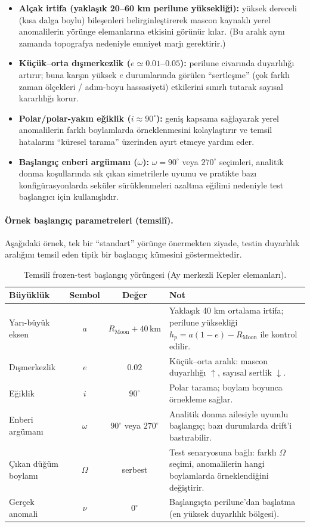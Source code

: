 \begin{itemize}
\item \textbf{Alçak irtifa (yaklaşık 20--60 km perilune yüksekliği):}
yüksek dereceli (kısa dalga boylu) bileşenleri belirginleştirerek mascon kaynaklı yerel anomalilerin
yörünge elemanlarına etkisini görünür kılar. (Bu aralık aynı zamanda topografya nedeniyle emniyet marjı gerektirir.)
\item \textbf{Küçük--orta dışmerkezlik ($e\simeq 0.01$--$0.05$):}
perilune civarında duyarlılığı artırır; buna karşın yüksek $e$ durumlarında görülen ``sertleşme''
(çok farklı zaman ölçekleri / adım-boyu hassasiyeti) etkilerini sınırlı tutarak sayısal kararlılığı korur.
\item \textbf{Polar/polar-yakın eğiklik ($i\approx 90^\circ$):}
geniş kapsama sağlayarak yerel anomalilerin farklı boylamlarda örneklenmesini kolaylaştırır ve
temsil hatalarını ``küresel tarama'' üzerinden ayırt etmeye yardım eder.
\item \textbf{Başlangıç enberi argümanı ($\omega$):}
$\omega=90^\circ$ veya $270^\circ$ seçimleri, analitik donma koşullarında sık çıkan simetrilerle uyumu ve
pratikte bazı konfigürasyonlarda seküler sürüklenmeleri azaltma eğilimi nedeniyle test başlangıcı için kullanışlıdır.
\end{itemize}

\paragraph{Örnek başlangıç parametreleri (temsilî).}
Aşağıdaki örnek, tek bir ``standart'' yörünge önermekten ziyade, testin duyarlılık aralığını
temsil eden tipik bir başlangıç kümesini göstermektedir.

\begin{table}[htbp]
\centering
\caption{Temsilî frozen-test başlangıç yörüngesi (Ay merkezli Kepler elemanları).}
\label{tab:frozen_test_ic}
\small
\begin{tabular}{l c c p{7.2cm}}
\toprule
\textbf{Büyüklük} & \textbf{Sembol} & \textbf{Değer} & \textbf{Not} \\
\midrule
Yarı-büyük eksen & $a$ &
$R_{\text{Moon}} + 40\,\text{km}$ &
Yaklaşık 40 km ortalama irtifa; perilune yüksekliği $h_p=a(1-e)-R_{\text{Moon}}$ ile kontrol edilir. \\
Dışmerkezlik & $e$ & $0.02$ &
Küçük--orta aralık: mascon duyarlılığı $\uparrow$, sayısal sertlik $\downarrow$. \\
Eğiklik & $i$ & $90^\circ$ &
Polar tarama; boylam boyunca örnekleme sağlar. \\
Enberi argümanı & $\omega$ & $90^\circ$ veya $270^\circ$ &
Analitik donma ailesiyle uyumlu başlangıç; bazı durumlarda drift’i bastırabilir. \\
Çıkan düğüm boylamı & $\Omega$ & serbest &
Test senaryosuna bağlı: farklı $\Omega$ seçimi, anomalilerin hangi boylamlarda örneklendiğini değiştirir. \\
Gerçek anomali & $\nu$ & $0^\circ$ &
Başlangıçta perilune’dan başlatma (en yüksek duyarlılık bölgesi). \\
\bottomrule
\end{tabular}
\end{table}

